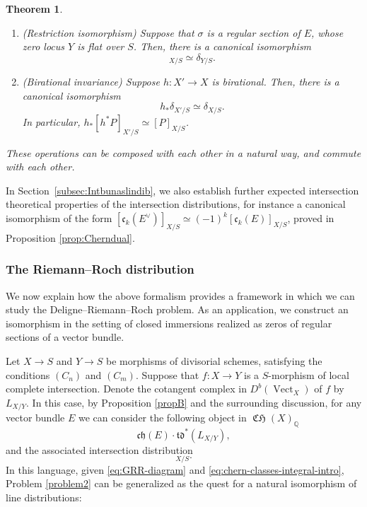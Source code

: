 \documentclass[JEP,XML,SOM,Unicode,published]{cedram}
\theoremstyle{plain}
\newtheorem{thm}{Theorem}
\theoremstyle{definition}
\newcommand{\QBbb}{\mathbb Q}
\newcommand{\cfrak}{\mathfrak c}
\newcommand{\chfrak}{\mathfrak {ch}}
\newcommand{\tdfrak}{\mathfrak {td}}
\DeclareMathOperator{\CHfrak}{\mathfrak{CH}}
\DeclareMathOperator{\Vect}{Vect}
\begin{document}
\begin{thm}
\begin{enumerate}
\item\label{item:thmE-5} (Restriction isomorphism) Suppose that $\sigma$ is a regular section of $E$, whose zero locus $Y$ is flat over $S$. Then, there is a canonical isomorphism
\begin{displaymath}
[ \cfrak_{r}(E) ]_{X/S} \simeq \delta_{Y/S}.
\end{displaymath}
\item\label{item:prop-int-dist-birational1} (Birational invariance) Suppose $h \colon X' \to X$ is birational. Then, there is a canonical isomorphism
\begin{displaymath}
h_\ast \delta_{X'/S}\simeq \delta_{X/S}.
\end{displaymath}
In particular, $h_{\ast}[h^{\ast}P]_{X'/S}\simeq [P]_{X/S}$.
\end{enumerate}
These operations can be composed with each other in a natural way, and commute with each other.

\end{thm}
In Section~\ref{subsec:Intbunaslindib}, we also establish further expected intersection theoretical properties of the intersection distributions, for instance a canonical isomorphism of the form $[\cfrak_{k}(E^{\vee})]_{X/S}\simeq (-1)^{k}[\cfrak_{k}(E)]_{X/S}$, proved in Proposition \ref{prop:Cherndual}.

\subsubsection*{The Riemann--Roch distribution}
We now explain how the above formalism provides a framework in which we can study the Deligne--Riemann--Roch problem. As an application, we construct an isomorphism in the setting of closed immersions realized as zeros of regular sections of a vector bundle.

Let $X\to S$ and $Y\to S$ be morphisms of divisorial schemes, satisfying the conditions $(C_{n})$ and $(C_{m})$. Suppose that $f\colon X\to Y$ is a $S$-morphism of local complete intersection. Denote the cotangent complex in $D^{b}(\Vect_X)$ of $f$ by $L_{X/Y}$. In this case, by Proposition \ref{propB} and the surrounding discussion, for any vector bundle $E$ we can consider the following object in $\CHfrak(X)_{\QBbb}$
\begin{displaymath}
\chfrak(E) \cdot \tdfrak^\ast(L_{X/Y}),
\end{displaymath}
and the associated intersection distribution
\begin{displaymath}
[\chfrak(E) \cdot \tdfrak^{\ast}(L_{X/Y})]_{X/S}.
\end{displaymath}
In this language, given \eqref{eq:GRR-diagram} and \eqref{eq:chern-classes-integral-intro}, Problem \ref{problem2} can be generalized as the quest for a natural isomorphism of line distributions:
\end{document}
